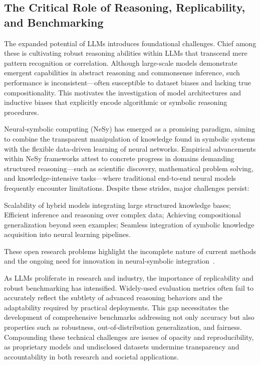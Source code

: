 \documentclass[sigconf]{acmart}
\begin{document}
\subsection{The Critical Role of Reasoning, Replicability, and Benchmarking}

The expanded potential of LLMs introduces foundational challenges. Chief among these is cultivating robust reasoning abilities within LLMs that transcend mere pattern recognition or correlation. Although large-scale models demonstrate emergent capabilities in abstract reasoning and commonsense inference, such performance is inconsistent—often susceptible to dataset biases and lacking true compositionality. This motivates the investigation of model architectures and inductive biases that explicitly encode algorithmic or symbolic reasoning procedures.

Neural-symbolic computing (NeSy) has emerged as a promising paradigm, aiming to combine the transparent manipulation of knowledge found in symbolic systems with the flexible data-driven learning of neural networks. Empirical advancements within NeSy frameworks attest to concrete progress in domains demanding structured reasoning—such as scientific discovery, mathematical problem solving, and knowledge-intensive tasks—where traditional end-to-end neural models frequently encounter limitations. Despite these strides, major challenges persist:

Scalability of hybrid models integrating large structured knowledge bases;
Efficient inference and reasoning over complex data;
Achieving compositional generalization beyond seen examples;
Seamless integration of symbolic knowledge acquisition into neural learning pipelines.

These open research problems highlight the incomplete nature of current methods and the ongoing need for innovation in neural-symbolic integration~\cite{ref49,ref54}.

As LLMs proliferate in research and industry, the importance of replicability and robust benchmarking has intensified. Widely-used evaluation metrics often fail to accurately reflect the subtlety of advanced reasoning behaviors and the adaptability required by practical deployments. This gap necessitates the development of comprehensive benchmarks addressing not only accuracy but also properties such as robustness, out-of-distribution generalization, and fairness. Compounding these technical challenges are issues of opacity and reproducibility, as proprietary models and undisclosed datasets undermine transparency and accountability in both research and societal applications.
\end{document}
